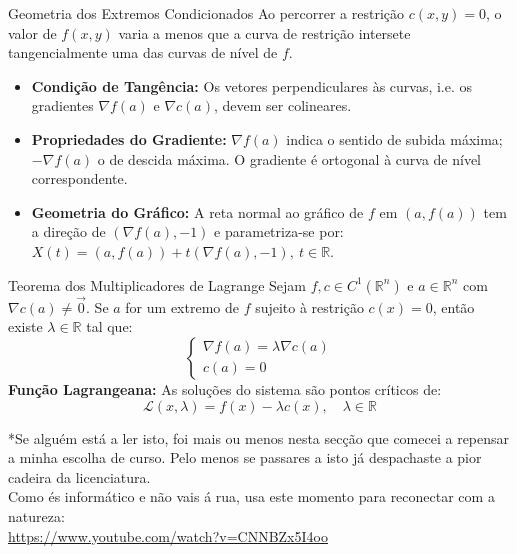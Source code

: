 \documentclass[11pt,a4paper]{article}
\newcommand{\R}{\mathbb{R}}
\begin{document}
\noindent\begin{minipage}[t]{\textwidth}
  \begin{definitionbox}{Geometria dos Extremos Condicionados}
    Ao percorrer a restrição $c(x, y) = 0$, o valor de $f(x, y)$ varia a menos que a curva de restrição intersete tangencialmente uma das curvas de nível de $f$.
    \begin{itemize}
      \item \textbf{Condição de Tangência:} Os vetores perpendiculares às curvas, i.e. os gradientes $\nabla f(a)$ e $\nabla c(a)$, devem ser colineares.
      \item \textbf{Propriedades do Gradiente:} $\nabla f(a)$ indica o sentido de subida máxima; $-\nabla f(a)$ o de descida máxima. O gradiente é ortogonal à curva de nível correspondente.
      \item \textbf{Geometria do Gráfico:} A reta normal ao gráfico de $f$ em $(a, f(a))$ tem a direção de $(\nabla f(a), -1)$ e parametriza-se por:
        $X(t) = (a, f(a)) + t(\nabla f(a), -1), \ t \in \R$.
    \end{itemize}
  \end{definitionbox}

  \begin{theorembox}{Teorema dos Multiplicadores de Lagrange}
    Sejam $f, c \in C^1(\R^n)$ e $a \in \R^n$ com $\nabla c(a) \neq \vec{0}$. Se $a$ for um extremo de $f$ sujeito à restrição $c(x) = 0$, então existe $\lambda \in \R$ tal que:
    \[ \begin{cases} \nabla f(a) = \lambda \nabla c(a) \\ c(a) = 0 \end{cases} \]
    \textbf{Função Lagrangeana:} As soluções do sistema são pontos críticos de:
    \[ \mathcal{L}(x, \lambda) = f(x) - \lambda c(x), \quad \lambda \in \R \]

    \vspace{1cm}


    *Se alguém está a ler isto, foi mais ou menos nesta secção que comecei a repensar a minha escolha de curso.
    Pelo menos se passares a isto já despachaste a pior cadeira da licenciatura. \\
    Como és informático e não vais á rua, usa este momento para reconectar com a natureza: \\ \url{https://www.youtube.com/watch?v=CNNBZx5I4oo}
  \end{theorembox}
\end{minipage}%
\newpage
\end{document}
